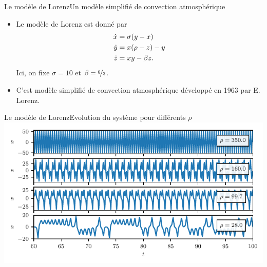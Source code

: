 \documentclass[usenames,dvipsnames,svgnames,10pt,aspectratio=169]{beamer}
\begin{document}
\begin{frame}[t, c]{Le modèle de Lorenz}{Un modèle simplifié de convection atmosphérique}

	\begin{itemize}
		\item Le modèle de Lorenz est donné par
		\begin{equation}
			\begin{aligned}
				\dot{x} & = \sigma ( y -x ) \\
				\dot{y} & = x(\rho - z) - y \\
				\dot{z} & = xy - \beta z.
			\end{aligned}
			\notag
		\end{equation}
		Ici, on fixe $\sigma = 10$ et $\beta = \nicefrac{8}{3}$.

		\bigskip

		\item C'est modèle simplifié de convection atmosphérique développé en 1963 par E. Lorenz.
	\end{itemize}

	\vspace{1cm}
\end{frame}

\begin{frame}[t, c]{Le modèle de Lorenz}{Evolution du système pour différents $\rho$}
	\centering
	\includegraphics[width=.75\textwidth]{lorenz_time_series}
\end{frame}
\end{document}
